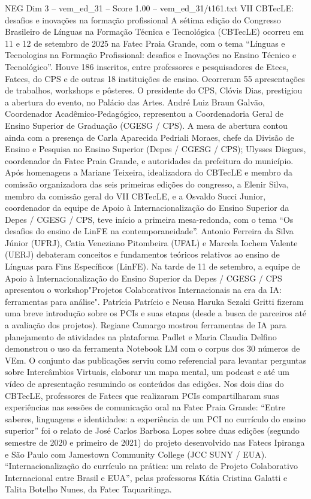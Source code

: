 \begin{textsample}{NEG Dim 3 – vem\_ed\_31 – Score 1.00 – vem\_ed\_31/t161.txt}  \label{ex:f3_neg_054}
VII CBTecLE: desafios e inovações na formação profissional A sétima edição do Congresso Brasileiro de Línguas na Formação Técnica e Tecnológica (CBTecLE) ocorreu em 11 e 12 de setembro de 2025 na Fatec Praia Grande, com o tema “Línguas e Tecnologias na Formação Profissional: desafios e Inovações no Ensino Técnico e Tecnológico”.
Houve 186 inscritos, entre professores e pesquisadores de Etecs, Fatecs, do CPS e de outras 18 instituições de ensino.
Ocorreram 55 apresentações de trabalhos, workshops e pôsteres.
O presidente do CPS, Clóvis Dias, prestigiou a abertura do evento, no Palácio das Artes.
André Luiz Braun Galvão, Coordenador Acadêmico-Pedagógico, representou a Coordenadoria Geral de Ensino Superior de Graduação (CGESG / CPS).
A mesa de abertura contou ainda com a presença de Carla Aparecida Pedriali Moraes, chefe da Divisão de Ensino e Pesquisa no Ensino Superior (Depes / CGESG / CPS); Ulysses Diegues, coordenador da Fatec Praia Grande, e autoridades da prefeitura do município.
Após homenagens a Mariane Teixeira, idealizadora do CBTecLE e membro da comissão organizadora das seis primeiras edições do congresso, a Elenir Silva, membro da comissão geral do VII CBTecLE, e a Osvaldo Succi Junior, coordenador da equipe de Apoio à Internacionalização do Ensino Superior da Depes / CGESG / CPS, teve início a primeira mesa-redonda, com o tema “Os desafios do ensino de LinFE na contemporaneidade”.
Antonio Ferreira da Silva Júnior (UFRJ), Catia Veneziano Pitombeira (UFAL) e Marcela Iochem Valente (UERJ) debateram conceitos e fundamentos teóricos relativos ao ensino de Línguas para Fins Específicos (LinFE).
Na tarde de 11 de setembro, a equipe de Apoio à Internacionalização do Ensino Superior da Depes / CGESG / CPS apresentou o workshop"Projetos Colaborativos Internacionais na era da IA: ferramentas para análise".
Patrícia Patrício e Neusa Haruka Sezaki Gritti fizeram uma breve introdução sobre os PCIs e suas etapas (desde a busca de parceiros até a avaliação dos projetos).
Regiane Camargo mostrou ferramentas de IA para planejamento de atividades na plataforma Padlet e Maria Claudia Delfino demonstrou o uso da ferramenta Notebook LM com o corpus dos 30 números de VEm.
O conjunto das publicações serviu como referencial para levantar perguntas sobre Intercâmbios Virtuais, elaborar um mapa mental, um podcast e até um vídeo de apresentação resumindo os conteúdos das edições.
Nos dois dias do CBTecLE, professores de Fatecs que realizaram PCIs compartilharam suas experiências nas sessões de comunicação oral na Fatec Praia Grande: “Entre saberes, linguagens e identidades: a experiência de um PCI no currículo do ensino superior” foi o relato de José Carlos Barbosa Lopes sobre duas edições (segundo semestre de 2020 e primeiro de 2021) do projeto desenvolvido nas Fatecs Ipiranga e São Paulo com Jamestown Community College (JCC SUNY / EUA). “Internacionalização do currículo na prática: um relato de Projeto Colaborativo Internacional entre Brasil e EUA”, pelas professoras Kátia Cristina Galatti e Talita Botelho Nunes, da Fatec Taquaritinga.

\end{textsample}
